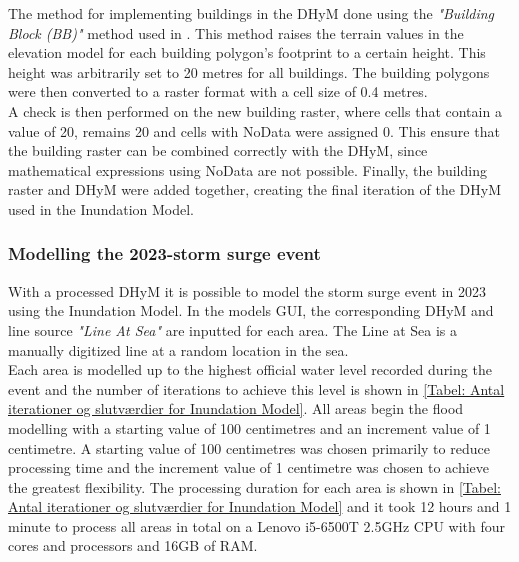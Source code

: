 The method for implementing buildings in the DHyM done using the \textit{"Building Block (BB)"} method used in \cite{khosh_bin_ghomash_technical_2024}. This method raises the terrain values in the elevation model for each building polygon's footprint to a certain height. This height was arbitrarily set to 20 metres for all buildings. The building polygons were then converted to a raster format with a cell size of 0.4 metres.\\
A check is then performed on the new building raster, where cells that contain a value of 20, remains 20 and cells with NoData were assigned 0. This ensure that the building raster can be combined correctly with the DHyM, since mathematical expressions using NoData are not possible. Finally, the building raster and DHyM were added together, creating the final iteration of the DHyM used in the Inundation Model.

\subsubsection{Modelling the 2023-storm surge event}\label{Afsnit: Simulering af stormflod 2023}
With a processed DHyM it is possible to model the storm surge event in 2023 using the Inundation Model. In the models GUI, the corresponding DHyM and line source \textit{"Line At Sea"} are inputted for each area. The Line at Sea is a manually digitized line at a random location in the sea. \\
Each area is modelled up to the highest official water level recorded during the event and the number of iterations to achieve this level is shown in \ref{Tabel: Antal iterationer og slutværdier for Inundation Model}. All areas begin the flood modelling with a starting value of 100 centimetres and an increment value of 1 centimetre. A starting value of 100 centimetres was chosen primarily to reduce processing time and the increment value of 1 centimetre was chosen to achieve the greatest flexibility. The processing duration for each area is shown in \ref{Tabel: Antal iterationer og slutværdier for Inundation Model} and it took 12 hours and 1 minute to process all areas in total on a Lenovo i5-6500T 2.5GHz CPU with four cores and processors and 16GB of RAM.\\





